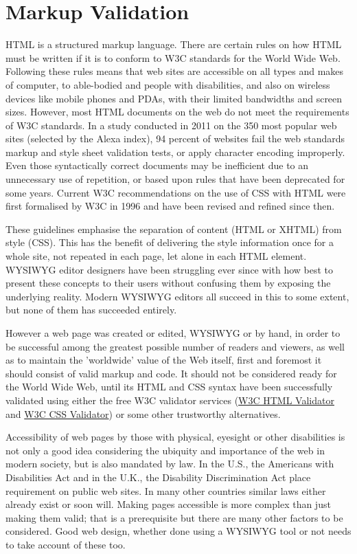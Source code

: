 \section{Markup Validation}

HTML is a structured markup language. There are certain rules on how HTML must be written if it is to conform to W3C standards for the World Wide Web. Following these rules means that web sites are accessible on all types and makes of computer, to able-bodied and people with disabilities, and also on wireless devices like mobile phones and PDAs, with their limited bandwidths and screen sizes. However, most HTML documents on the web do not meet the requirements of W3C standards. In a study conducted in 2011 on the 350 most popular web sites (selected by the Alexa index), 94 percent of websites fail the web standards markup and style sheet validation tests, or apply character encoding improperly. Even those syntactically correct documents may be inefficient due to an unnecessary use of repetition, or based upon rules that have been deprecated for some years. Current W3C recommendations on the use of CSS with HTML were first formalised by W3C in 1996 and have been revised and refined since then. 


These guidelines emphasise the separation of content (HTML or XHTML) from style (CSS). This has the benefit of delivering the style information once for a whole site, not repeated in each page, let alone in each HTML element. WYSIWYG editor designers have been struggling ever since with how best to present these concepts to their users without confusing them by exposing the underlying reality. Modern WYSIWYG editors all succeed in this to some extent, but none of them has succeeded entirely.

However a web page was created or edited, WYSIWYG or by hand, in order to be successful among the greatest possible number of readers and viewers, as well as to maintain the 'worldwide' value of the Web itself, first and foremost it should consist of valid markup and code. It should not be considered ready for the World Wide Web, until its HTML and CSS syntax have been successfully validated using either the free W3C validator services (\href{http://validator.w3.org/}{W3C HTML Validator} and \href{http://jigsaw.w3.org/css-validator/}{W3C CSS Validator}) or some other trustworthy alternatives.

Accessibility of web pages by those with physical, eyesight or other disabilities is not only a good idea considering the ubiquity and importance of the web in modern society, but is also mandated by law. In the U.S., the Americans with Disabilities Act and in the U.K., the Disability Discrimination Act place requirement on public web sites. In many other countries similar laws either already exist or soon will. Making pages accessible is more complex than just making them valid; that is a prerequisite but there are many other factors to be considered. Good web design, whether done using a WYSIWYG tool or not needs to take account of these too.

